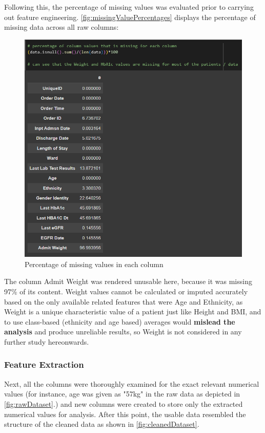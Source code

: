 \noindent Following this, the percentage of missing values was evaluated prior to carrying out feature engineering. \autoref{fig:missingValuePercentages} displays the percentage of missing data across all raw columns:

\begin{figure}[H]
		\centering
		\includegraphics[scale=0.4]{figures/python_code/percent_missing_values_in_every_column.png}
		\caption{Percentage of missing values in each column}
		\label{fig:missingValuePercentages}
\end{figure}

\noindent The column Admit Weight was rendered unusable here, because it was missing 97\% of its content. Weight values cannot be calculated or imputed accurately based on the only available related features that were Age and Ethnicity, as Weight is a unique characteristic value of a patient just like Height and BMI, and to use class-based (ethnicity and age based) averages would \textbf{mislead the analysis} and produce unreliable results, so Weight is not considered in any further study hereonwards.

\subsubsection{Feature Extraction}
\noindent Next, all the columns were thoroughly examined for the exact relevant numerical values (for instance, age was given as "57kg" in the raw data as depicted in \autoref{fig:rawDataset}.) and new columns were created to store only the extracted numerical values for analysis. After this point, the usable data resembled the structure of the cleaned data as shown in \autoref{fig:cleanedDataset}.

